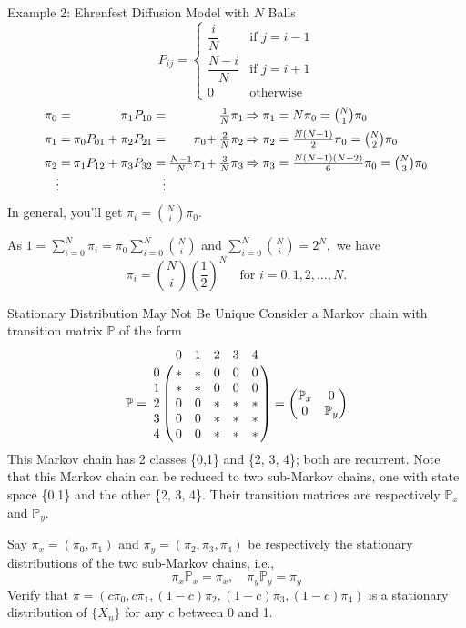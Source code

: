 \documentclass[letterpaper,handout]{beamer}
\def\P{\mathbb{P}}
\begin{document}
\begin{frame}{Example 2: Ehrenfest Diffusion Model with $N$ Balls}
$$
P_{ij}=
\begin{cases}
\dfrac{i}{N}    & \text{if }j=i-1\\[5pt]
\dfrac{N-i}{N}  & \text{if }j=i+1\\
0   & \text{otherwise}
\end{cases}
$$
$$
\arraycolsep=1pt
\begin{array}{crrcl}
\pi_0=&            \pi_1P_{10}=&                     &\frac{1}{N}\pi_1&\Rightarrow\pi_1=N\pi_0={N\choose 1}\pi_0\\[5pt]
\pi_1=&\pi_0P_{01}+\pi_2P_{21}=&               \pi_0+&\frac{2}{N}\pi_2&\Rightarrow\pi_2=\frac{N(N-1)}{2}\pi_0={N\choose 2}\pi_0\\[5pt]
\pi_2=&\pi_1P_{12}+\pi_3P_{32}=&\frac{N-1}{N}\pi_1+&\frac{3}{N}\pi_3&\Rightarrow\pi_3=\frac{N(N-1)(N-2)}{6}\pi_0={N\choose 3}\pi_0\\
\vdots&\vdots
\end{array}
$$
In general, you'll get $\pi_i={N\choose i}\pi_0$.\par
As $1=\sum_{i=0}^N\pi_i=\pi_0\sum_{i=0}^N{N\choose i}$ and $\sum_{i=0}^N{N\choose i}=2^N,$ we have
$$
\pi_i={N\choose i}\left(\frac{1}{2}\right)^{N}\quad\text{for }i=0,1,2,\ldots,N.
$$
\end{frame}
\begin{frame}{Stationary Distribution May Not Be Unique}
Consider a Markov chain with transition matrix $\P$ of the form
$$
\P=
\bordermatrix{%
  &  0  &  1  &  2  &  3  &  4 \cr
0 &  *  &  *  &  0  &  0  &  0 \cr
1 &  *  &  *  &  0  &  0  &  0 \cr
2 &  0  &  0  &  *  &  *  &  * \cr
3 &  0  &  0  &  *  &  *  &  * \cr
4 &  0  &  0  &  *  &  *  &  *
}
=
\begin{pmatrix}
\P_x & 0\\
0 & \P_y
\end{pmatrix}
$$
This Markov chain has 2 classes \{0,1\} and \{2, 3, 4\}; both are recurrent.
Note that this Markov chain can be reduced to two sub-Markov chains, one with state space \{0,1\} and the other \{2, 3, 4\}.
Their transition matrices are respectively $\P_x$ and $\P_y$.\par\medskip

Say $\pi_x=(\pi_0,\pi_1)$ and $\pi_y=(\pi_2,\pi_3,\pi_4)$ be respectively the stationary distributions of the two sub-Markov chains, i.e.,
$$
\pi_x\P_x=\pi_x,\quad \pi_y\P_y=\pi_y
$$
Verify that $\pi = (c\pi_0,c\pi_1,(1-c)\pi_2,(1-c)\pi_3,(1-c)\pi_4)$ is a stationary distribution of $\{X_n\}$ for any $c$ between 0 and 1.
\end{frame}
\end{document}
